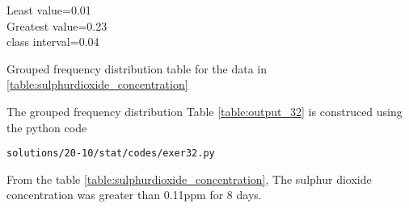 Least value=0.01\\
Greatest value=0.23\\
class interval=0.04\\
\begin{table}[ht!]
\centering

\caption{Grouped frequency distribution table for the data in \ref{table:sulphurdioxide_concentration}}
\label{table:output_32}
\end{table}
The grouped frequency distribution Table \ref{table:output_32} is construced using the python code
\begin{lstlisting}
solutions/20-10/stat/codes/exer32.py
\end{lstlisting}
From the table \ref{table:sulphurdioxide_concentration}, The sulphur dioxide concentration was greater than 0.11ppm for 8 days. 
